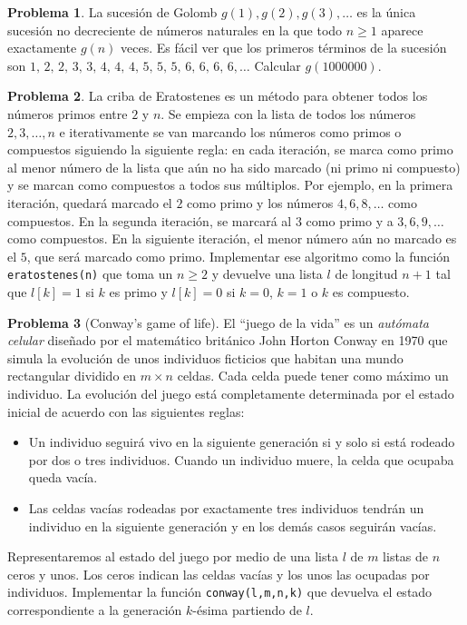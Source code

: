 \documentclass[a4paper, 11pt]{article}
\newcounter{numerodetema}
\theoremstyle{plain}
\theoremstyle{definition}
\newtheorem{prob}{Problema}[numerodetema]
\begin{document}
\begin{prob}
La sucesión de Golomb $g(1),g(2),g(3),\ldots$ es la única sucesión no decreciente
de números naturales en la que todo $n\geq 1$ aparece exactamente $g(n)$ veces.
Es fácil ver que los primeros términos de la sucesión son $1,\,2,\,2,\,3,\,3,\,4,
\,4,\,4,\,5,\,5,\,5,\,6,\,6,\,6,\,6,\ldots$ Calcular $g(1000000)$.
\end{prob}

\begin{prob}
La criba de Eratostenes es un método para obtener todos los números primos
entre $2$ y $n$. Se empieza con la lista de todos los números $2,3,\ldots,n$ e
iterativamente se van marcando los números como primos o compuestos siguiendo
la siguiente regla: en cada iteración, se marca como primo al menor número de
la lista que aún no ha sido marcado (ni primo ni compuesto) y se marcan como
compuestos a todos sus múltiplos. Por ejemplo, en la primera iteración,
quedará marcado el $2$ como primo y los números $4,6,8,\ldots$ como compuestos.
En la segunda iteración, se marcará al $3$ como primo y a $3,6,9,\ldots$ como
compuestos. En la siguiente iteración, el menor número aún no marcado es el $5$,
que será marcado como primo. Implementar ese algoritmo como la función
\texttt{eratostenes(n)} que toma un $n\geq 2$ y devuelve una lista $l$ de
longitud $n+1$ tal que $l[k]=1$ si $k$ es primo y $l[k]=0$ si $k=0$, 
$k=1$ o $k$ es compuesto.
\end{prob}

\begin{prob}[Conway's game of life]
El ``juego de la vida'' es un \emph{autómata celular} diseñado por el matemático
británico John Horton Conway en 1970 que simula la evolución de unos individuos
ficticios que habitan una mundo rectangular dividido en $m\times n$ celdas. Cada
celda puede tener como máximo un individuo. La evolución del juego está
completamente determinada por el estado inicial de acuerdo con las siguientes
reglas:
\begin{itemize}
\item Un individuo seguirá vivo en la siguiente generación si y solo si está
rodeado por dos o tres individuos. Cuando un individuo muere, la celda que
ocupaba queda vacía.
\item Las celdas vacías rodeadas por exactamente tres individuos tendrán un
individuo en la siguiente generación y en los demás casos seguirán vacías.
\end{itemize}
Representaremos al estado del juego por medio de una lista $l$ de $m$ listas de
$n$ ceros y unos. Los ceros indican las celdas vacías y los unos las ocupadas por
individuos. Implementar la función \texttt{conway(l,m,n,k)} que devuelva el
estado correspondiente a la generación $k$-ésima partiendo de $l$.
\end{prob}
\end{document}
